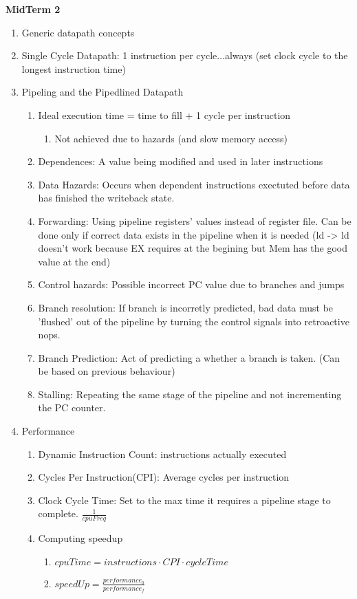 \documentclass[12pt]{article}
\renewcommand{\=}[1]{\stackrel{#1}{=}} %
\theoremstyle{definition}
\theoremstyle{remark}
\begin{document}
  \textbf{MidTerm 2}
  \begin{enumerate}
  \item Generic datapath concepts
  \item Single Cycle Datapath: 1 instruction per cycle...always (set
    clock cycle to the longest instruction time)
  \item Pipeling and the Pipedlined Datapath
    \begin{enumerate}
    \item Ideal execution time = time to fill + 1 cycle per instruction
      \begin{enumerate}
      \item Not achieved due to hazards (and slow memory access)
      \end{enumerate}

    \item Dependences: A value being modified and used in later instructions
    \item Data Hazards: Occurs when dependent instructions exectuted
      before data has finished the writeback state.
    \item Forwarding: Using pipeline registers' values instead of
      register file. Can be done only if correct data exists in the
      pipeline when it is needed (ld -> ld doesn't work because EX
      requires at the begining but Mem has the good value at the end)
    \item Control hazards: Possible incorrect PC value due to branches
      and jumps
    \item Branch resolution: If branch is incorretly predicted, bad
      data must be 'flushed' out of the pipeline by turning the
      control signals into retroactive nops.
    \item Branch Prediction: Act of predicting a whether a branch is
      taken. (Can be based on previous behaviour)
    \item Stalling: Repeating the same stage of the pipeline and not
      incrementing the PC counter.
    \end{enumerate}
  \item Performance
    \begin{enumerate}
    \item Dynamic Instruction Count: instructions actually executed
    \item Cycles Per Instruction(CPI): Average cycles per instruction
    \item Clock Cycle Time: Set to the max time it requires a pipeline
      stage to complete. $\frac{1}{cpuFreq}$
    \item Computing speedup
      \begin{enumerate}
      \item $cpuTime = instructions\cdot CPI \cdot cycleTime$
      \item $speedUp = \frac{performance_0}{performance_f}$
      \end{enumerate}


\end{enumerate}
\end{enumerate}
\end{document}
